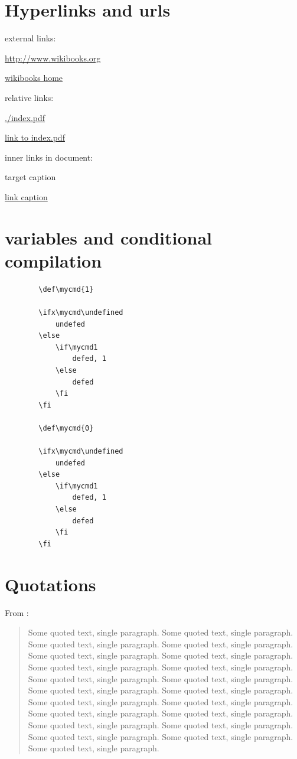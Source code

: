 \documentclass[12pt]{article}
\begin{document}
\section{Hyperlinks and urls}\label{hyperlinks-urls}

    external links:

    \url{http://www.wikibooks.org}

    \href{http://www.wikibooks.org}{wikibooks home}

    relative links:

    \url{./index.pdf}

    \href{./index.pdf}{link to index.pdf}

    inner links in document:

    \hypertarget{label}{target caption}

    \hyperlink{label}{link caption}

    \section{variables and conditional compilation}

    \begin{lstlisting}
        \def\mycmd{1}

        \ifx\mycmd\undefined
            undefed
        \else
            \if\mycmd1
                defed, 1
            \else
                defed
            \fi
        \fi

        \def\mycmd{0}

        \ifx\mycmd\undefined
            undefed
        \else
            \if\mycmd1
                defed, 1
            \else
                defed
            \fi
        \fi
    \end{lstlisting}

\section{Quotations}\label{quotations}

    From \cite{Aa00}:

    \begin{quote}
        Some quoted text, single paragraph. Some quoted text, single paragraph. Some quoted text, single paragraph.
        Some quoted text, single paragraph. Some quoted text, single paragraph. Some quoted text, single paragraph.
        Some quoted text, single paragraph. Some quoted text, single paragraph. Some quoted text, single paragraph.
        Some quoted text, single paragraph. Some quoted text, single paragraph. Some quoted text, single paragraph.
        Some quoted text, single paragraph. Some quoted text, single paragraph. Some quoted text, single paragraph.
        Some quoted text, single paragraph. Some quoted text, single paragraph. Some quoted text, single paragraph.
        Some quoted text, single paragraph. Some quoted text, single paragraph. Some quoted text, single paragraph.
    \end{quote}
\end{document}
